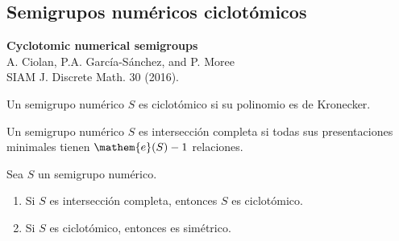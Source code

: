 \documentclass[10pt,compress]{beamer}
\begin{document}
\subsection{Semigrupos numéricos ciclotómicos}

\begin{frame}
  \begin{tcolorbox}[colback=ChetwodeBlue!10,colframe=ChetwodeBlue!60]
    \begin{center}
      \vspace*{-1mm}
      {\color{TurkishRose}\textbf{Cyclotomic numerical semigroups}} \\
      A. Ciolan, P.A. García-Sánchez, and P. Moree \\
      SIAM J. Discrete Math. 30 (2016).
    \end{center}
    \vspace*{-6mm}
  \end{tcolorbox}

  \begin{definition}
    Un semigrupo numérico $S$ es ciclotómico si su polinomio es de Kronecker.
  \end{definition}

  \begin{definition}
    Un semigrupo numérico $S$ es intersección completa si todas sus presentaciones minimales tienen $\mathem{e}(S)-1$ relaciones.
  \end{definition}

  \begin{theorem} 
    Sea $S$ un semigrupo numérico.
    \begin{enumerate}
    \item Si $S$ es intersección completa, entonces $S$ es ciclotómico.
    \item Si $S$ es ciclotómico, entonces es simétrico.
    \end{enumerate}
  \end{theorem}
\end{frame}
\end{document}
